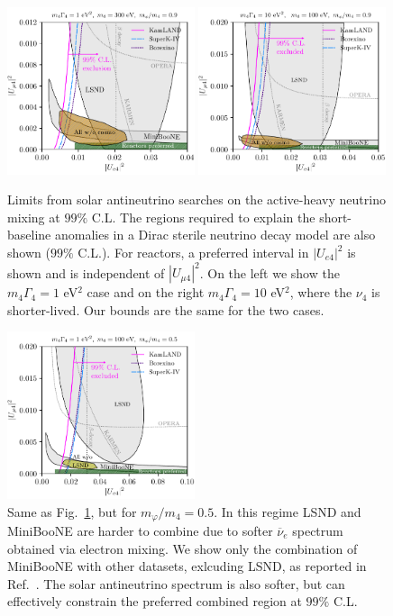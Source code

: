 \documentclass[
reprint,
superscriptaddress,
showpacs,
preprintnumbers,
nofootinbib,
nobibnotes,
amsmath,
amssymb, 
aps,
prd,
floatfix
]{revtex4-1}
\newcommand{\reffig}[1]{Fig.~\ref{#1}}
\newcommand{\refref}[1]{Ref.~\cite{#1}}
\renewcommand{\phi}{\varphi}
\begin{document}
%
\begin{figure}[t]
    \centering
    \includegraphics[width=0.49\textwidth]{limits_MN_300_MB_270.pdf}
    \includegraphics[width=0.49\textwidth]{limits_MN_300_MB_270_v2.pdf}
\caption{\label{fig:limits}Limits from solar antineutrino searches on the active-heavy neutrino mixing at $99\%$ C.L. The regions required to explain the short-baseline anomalies in a Dirac sterile neutrino decay model are also shown ($99\%$ C.L.). For reactors, a preferred interval in $|U_{e4}|^2$ is shown and is independent of $|U_{\mu 4}|^2$. On the left we show the $m_4 \Gamma_4 = 1$ eV$^2$ case and on the right $m_4 \Gamma_4 = 10$ eV$^2$, where the $\nu_4$ is shorter-lived. Our bounds are the same for the two cases.}
\end{figure}

%
\begin{figure}[t]
    \centering
    \includegraphics[width=0.49\textwidth]{limits_MN_100_MB_50.pdf}
\caption{\label{fig:limits2}Same as \reffig{fig:limits}, but for $m_\phi/m_4 = 0.5$. In this regime LSND and MiniBooNE are harder to combine due to softer $\overline{\nu}_e$ spectrum obtained via electron mixing. We show only the combination of MiniBooNE with other datasets, exlcuding LSND, as reported in \refref{Dentler:2019dhz}. The solar antineutrino spectrum is also softer, but can effectively constrain the preferred combined region at $99\%$ C.L.}
\end{figure}
\end{document}
